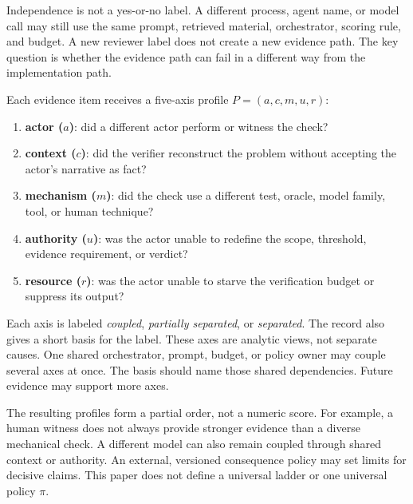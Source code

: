 \documentclass[11pt]{article}
\begin{document}
Independence is not a yes-or-no label. A different process, agent name, or model call may still use the same prompt, retrieved material, orchestrator, scoring rule, and budget. A new reviewer label does not create a new evidence path. The key question is whether the evidence path can fail in a different way from the implementation path.

Each evidence item receives a five-axis profile $P=(a,c,m,u,r)$:

\begin{enumerate}
  \item \textbf{actor ($a$)}: did a different actor perform or witness the check?
  \item \textbf{context ($c$)}: did the verifier reconstruct the problem without accepting the actor's narrative as fact?
  \item \textbf{mechanism ($m$)}: did the check use a different test, oracle, model family, tool, or human technique?
  \item \textbf{authority ($u$)}: was the actor unable to redefine the scope, threshold, evidence requirement, or verdict?
  \item \textbf{resource ($r$)}: was the actor unable to starve the verification budget or suppress its output?
\end{enumerate}

Each axis is labeled \emph{coupled}, \emph{partially separated}, or \emph{separated}. The record also gives a short basis for the label. These axes are analytic views, not separate causes. One shared orchestrator, prompt, budget, or policy owner may couple several axes at once. The basis should name those shared dependencies. Future evidence may support more axes.

The resulting profiles form a partial order, not a numeric score. For example, a human witness does not always provide stronger evidence than a diverse mechanical check. A different model can also remain coupled through shared context or authority. An external, versioned consequence policy may set limits for decisive claims. This paper does not define a universal ladder or one universal policy $\pi$.
\end{document}
